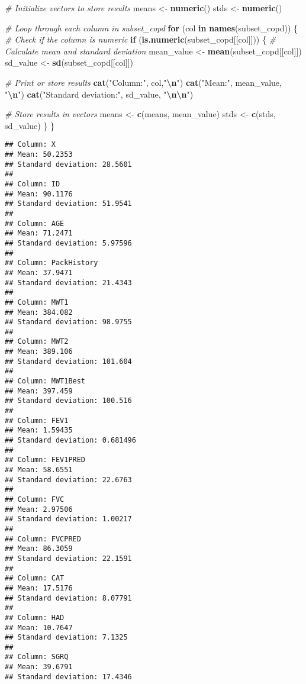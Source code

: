 \documentclass[
]{article}
\newenvironment{Shaded}{\begin{snugshade}}{\end{snugshade}}
\newcommand{\CommentTok}[1]{\textcolor[rgb]{0.56,0.35,0.01}{\textit{#1}}}
\newcommand{\ControlFlowTok}[1]{\textcolor[rgb]{0.13,0.29,0.53}{\textbf{#1}}}
\newcommand{\FunctionTok}[1]{\textcolor[rgb]{0.13,0.29,0.53}{\textbf{#1}}}
\newcommand{\NormalTok}[1]{#1}
\newcommand{\OtherTok}[1]{\textcolor[rgb]{0.56,0.35,0.01}{#1}}
\newcommand{\SpecialCharTok}[1]{\textcolor[rgb]{0.81,0.36,0.00}{\textbf{#1}}}
\newcommand{\StringTok}[1]{\textcolor[rgb]{0.31,0.60,0.02}{#1}}
\begin{document}
\begin{Shaded}
\begin{Highlighting}[]
\CommentTok{\# Initialize vectors to store results}
\NormalTok{means }\OtherTok{\textless{}{-}} \FunctionTok{numeric}\NormalTok{()}
\NormalTok{stds }\OtherTok{\textless{}{-}} \FunctionTok{numeric}\NormalTok{()}

\CommentTok{\# Loop through each column in subset\_copd}
\ControlFlowTok{for}\NormalTok{ (col }\ControlFlowTok{in} \FunctionTok{names}\NormalTok{(subset\_copd)) \{}
  \CommentTok{\# Check if the column is numeric}
  \ControlFlowTok{if}\NormalTok{ (}\FunctionTok{is.numeric}\NormalTok{(subset\_copd[[col]])) \{}
    \CommentTok{\# Calculate mean and standard deviation}
\NormalTok{    mean\_value }\OtherTok{\textless{}{-}} \FunctionTok{mean}\NormalTok{(subset\_copd[[col]])}
\NormalTok{    sd\_value }\OtherTok{\textless{}{-}} \FunctionTok{sd}\NormalTok{(subset\_copd[[col]])}
    
    \CommentTok{\# Print or store results}
    \FunctionTok{cat}\NormalTok{(}\StringTok{"Column:"}\NormalTok{, col,}\StringTok{"}\SpecialCharTok{\textbackslash{}n}\StringTok{"}\NormalTok{)}
    \FunctionTok{cat}\NormalTok{(}\StringTok{"Mean:"}\NormalTok{, mean\_value, }\StringTok{"}\SpecialCharTok{\textbackslash{}n}\StringTok{"}\NormalTok{)}
    \FunctionTok{cat}\NormalTok{(}\StringTok{"Standard deviation:"}\NormalTok{, sd\_value, }\StringTok{"}\SpecialCharTok{\textbackslash{}n\textbackslash{}n}\StringTok{"}\NormalTok{)}
    
    \CommentTok{\# Store results in vectors}
\NormalTok{    means }\OtherTok{\textless{}{-}} \FunctionTok{c}\NormalTok{(means, mean\_value)}
\NormalTok{    stds }\OtherTok{\textless{}{-}} \FunctionTok{c}\NormalTok{(stds, sd\_value)}
\NormalTok{  \}}
\NormalTok{\}}
\end{Highlighting}
\end{Shaded}

\begin{verbatim}
## Column: X 
## Mean: 50.2353 
## Standard deviation: 28.5601 
## 
## Column: ID 
## Mean: 90.1176 
## Standard deviation: 51.9541 
## 
## Column: AGE 
## Mean: 71.2471 
## Standard deviation: 5.97596 
## 
## Column: PackHistory 
## Mean: 37.9471 
## Standard deviation: 21.4343 
## 
## Column: MWT1 
## Mean: 384.082 
## Standard deviation: 98.9755 
## 
## Column: MWT2 
## Mean: 389.106 
## Standard deviation: 101.604 
## 
## Column: MWT1Best 
## Mean: 397.459 
## Standard deviation: 100.516 
## 
## Column: FEV1 
## Mean: 1.59435 
## Standard deviation: 0.681496 
## 
## Column: FEV1PRED 
## Mean: 58.6551 
## Standard deviation: 22.6763 
## 
## Column: FVC 
## Mean: 2.97506 
## Standard deviation: 1.00217 
## 
## Column: FVCPRED 
## Mean: 86.3059 
## Standard deviation: 22.1591 
## 
## Column: CAT 
## Mean: 17.5176 
## Standard deviation: 8.07791 
## 
## Column: HAD 
## Mean: 10.7647 
## Standard deviation: 7.1325 
## 
## Column: SGRQ 
## Mean: 39.6791 
## Standard deviation: 17.4346
\end{verbatim}
\end{document}

